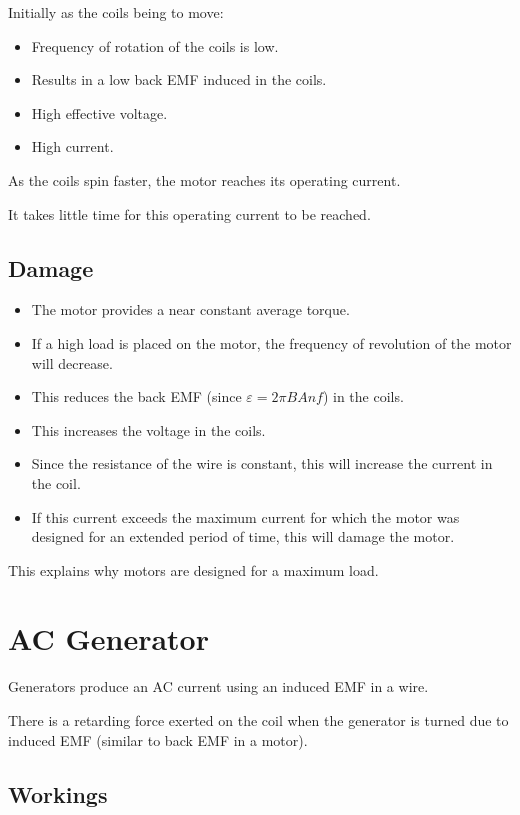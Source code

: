 \documentclass[a4paper,11pt]{article}
\begin{document}
Initially as the coils being to move:

\begin{itemize}
\item Frequency of rotation of the coils is low.
\item Results in a low back EMF induced in the coils.
\item High effective voltage.
\item High current.
\end{itemize}

As the coils spin faster, the motor reaches its operating current.

It takes little time for this operating current to be reached.


\subsection{Damage}

\begin{itemize}
\item The motor provides a near constant average torque.
\item If a high load is placed on the motor, the frequency of revolution of the
	motor will decrease.
\item This reduces the back EMF (since $\varepsilon = 2 \pi BAnf$) in the coils.
\item This increases the voltage in the coils.
\item Since the resistance of the wire is constant, this will increase the
	current in the coil.
\item If this current exceeds the maximum current for which the motor was
	designed for an extended period of time, this will damage the motor.
\end{itemize}

This explains why motors are designed for a maximum load.




\section{AC Generator}

Generators produce an AC current using an induced EMF in a wire.

There is a retarding force exerted on the coil when the generator is turned due
to induced EMF (similar to back EMF in a motor).


\subsection{Workings}
\end{document}
